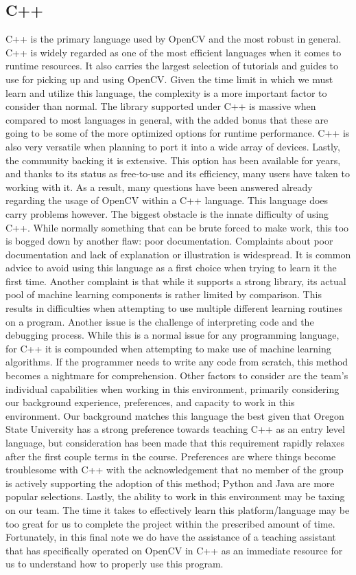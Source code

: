 \documentclass[onecolumn, draftclsnofoot,10pt, compsoc]{IEEEtran}
\begin{document}
\subsection{C++}
C++ is the primary language used by OpenCV and the most robust in general. C++ is widely regarded as one of the most efficient languages when it comes to runtime resources. It also carries the largest selection of tutorials and guides to use for picking up and using OpenCV. Given the time limit in which we must learn and utilize this language, the complexity is a more important factor to consider than normal. The library supported under C++ is massive when compared to most languages in general, with the added bonus that these are going to be some of the more optimized options for runtime performance. C++ is also very versatile when planning to port it into a wide array of devices. Lastly, the community backing it is extensive. This option has been available for years, and thanks to its status as free-to-use and its efficiency, many users have taken to working with it. As a result, many questions have been answered already regarding the usage of OpenCV within a C++ language. This language does carry problems however. The biggest obstacle is the innate difficulty of using C++. While normally something that can be brute forced to make work, this too is bogged down by another flaw: poor documentation. Complaints about poor documentation and lack of explanation or illustration is widespread. It is common advice to avoid using this language as a first choice when trying to learn it the first time. Another complaint is that while it supports a strong library, its actual pool of machine learning components is rather limited by comparison. This results in difficulties when attempting to use multiple different learning routines on a program. Another issue is the challenge of interpreting code and the debugging process. While this is a normal issue for any programming language, for C++ it is compounded when attempting to make use of machine learning algorithms. If the programmer needs to write any code from scratch, this method becomes a nightmare for comprehension. Other factors to consider are the team’s individual capabilities when working in this environment, primarily considering our background experience, preferences, and capacity to work in this environment. Our background matches this language the best given that Oregon State University has a strong preference towards teaching C++ as an entry level language, but consideration has been made that this requirement rapidly relaxes after the first couple terms in the course. Preferences are where things become troublesome with C++ with the acknowledgement that no member of the group is actively supporting the adoption of this method; Python and Java are more popular selections. Lastly, the ability to work in this environment may be taxing on our team. The time it takes to effectively learn this platform/language may be too great for us to complete the project within the prescribed amount of time. Fortunately, in this final note we do have the assistance of a teaching assistant that has specifically operated on OpenCV in C++ as an immediate resource for us to understand how to properly use this program.
\end{document}
